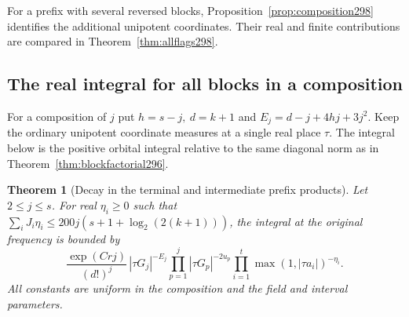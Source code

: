 \documentclass[a4paper,11pt]{article}
\newtheorem{theorem}[proposition]{Theorem}
\theoremstyle{definition}
\theoremstyle{remark}
\numberwithin{equation}{section}
\begin{document}
For a prefix with several reversed blocks, Proposition~\ref{prop:composition298} identifies the additional unipotent coordinates. Their real and finite contributions are compared in Theorem~\ref{thm:allflags298}.

\subsection{The real integral for all blocks in a composition}\label{nav:VII-58}
For a composition of \(j\) put \(h=s-j,\ d=k+1\) and
\(E_j=d-j+4hj+3j^2\). Keep the ordinary unipotent coordinate
measures at a single real place \(\tau\). The integral below
is the positive orbital integral relative to the same
diagonal norm as in Theorem~\ref{thm:blockfactorial296}.

\begin{theorem}[Decay in the terminal and intermediate prefix products]\leavevmode
\label{thm:compositionreal298}
Let \(2\le j\le s\). For real \(\eta_i\ge0\) such that
\(\sum_i J_i\eta_i\le200j(s+1+\log_2(2(k+1)))\), the
integral at the original frequency is bounded by
\[
 \frac{\exp(Crj)}{(d!)^j}\,
 |\tau G_j|^{-E_j}
 \prod_{p=1}^j|\tau G_p|^{-2u_p}
 \prod_{i=1}^t\max(1,|\tau a_i|)^{-\eta_i}.
\]
All constants are uniform in the composition and the
field and interval parameters.
\end{theorem}
\end{document}
